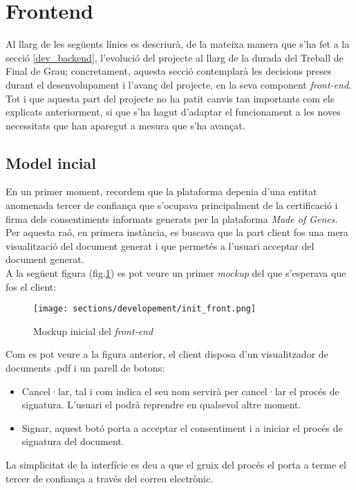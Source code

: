 \section{Frontend}
\label{desenvolupament:frontend}
Al llarg de les següents línies es descriurà, de la mateixa manera que s'ha fet a la secció \ref{dev_backend}, l'evolució del projecte al llarg de la durada del Treball de Final de Grau; concretament, aquesta secció contemplarà les decisions preses durant el desenvolupament i l'avanç del projecte, en la seva component \textit{front-end}.\\
\newline Tot i que aquesta part del projecte no ha patit canvis tan importants com els explicats anteriorment, si que s'ha hagut d'adaptar el funcionament a les noves necessitats que han aparegut a mesura que s'ha avançat.\\

\subsection{Model incial}
En un primer moment, recordem que la plataforma depenia d'una entitat anomenada tercer de confiança que s'ocupava principalment de la certificació i firma dels consentiments informats generats per la plataforma \textit{Made of Genes}.
Per aquesta raó, en primera instància, es buscava que la part client fos una mera visualització del document generat i que permetés a l'usuari acceptar del document generat.\\
\newline A la següent figura (fig.\ref{fig:front_init}) es pot veure un primer \textit{mockup} del que s'esperava que fos el client:
\begin{figure}[h]
\texttt{[image: sections/developement/init\_front.png]}
\centering
\caption{Mockup inicial del \textit{front-end}}
\label{fig:front_init}
\end{figure}
\newline Com es pot veure a la figura anterior, el client disposa d'un visualitzador de documents .pdf i un parell de botons:
\begin{itemize}
    \item Cancel·lar, tal i com indica el seu nom servirà per cancel·lar el procés de signatura. L'usuari el podrà reprendre en qualsevol altre moment.
    \item Signar, aquest botó porta a acceptar el consentiment i a iniciar el procés de signatura del document.
\end{itemize}
La simplicitat de la interfície es deu a que el gruix del procés el porta a terme el tercer de confiança a través del correu electrònic.\\

